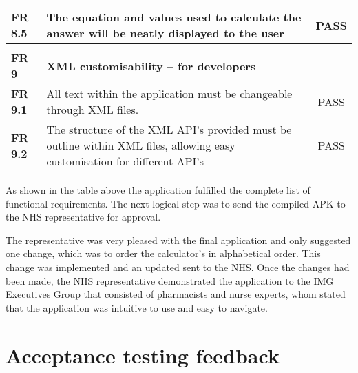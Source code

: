 \begin{center}
\begin{longtable}{| l | p{11cm} | c |}
\textbf{FR 8.5}                 & The equation and values used to calculate the answer will be neatly displayed to the user                                                                                  & PASS      \\ \hline
\textbf{}                       &                                                                                                                                                                            &           \\ \hline
\textbf{FR 9}                   & \textbf{XML customisability – for developers}                                                                                                                              &           \\ \hline
\textbf{FR 9.1}                 & All text within the application must be changeable through XML files.                                                                                                      & PASS      \\ \hline
\textbf{FR 9.2}                 & The structure of the XML API's provided must be outline within XML files, allowing easy customisation for different API's                                                  & PASS      \\ \hline
\end{longtable}
\end{center}

As shown in the table above the application fulfilled the complete list of functional requirements. The next logical step was to send the compiled APK to the NHS representative for approval.

The representative was very pleased with the final application and only suggested one change, which was to order the calculator's in alphabetical order. This change was implemented and an updated sent to the NHS. Once the changes had been made, the NHS representative demonstrated the application to the IMG Executives Group that consisted of pharmacists and nurse experts, whom stated that the application was intuitive to use and easy to navigate.
 
\section{Acceptance testing feedback}

